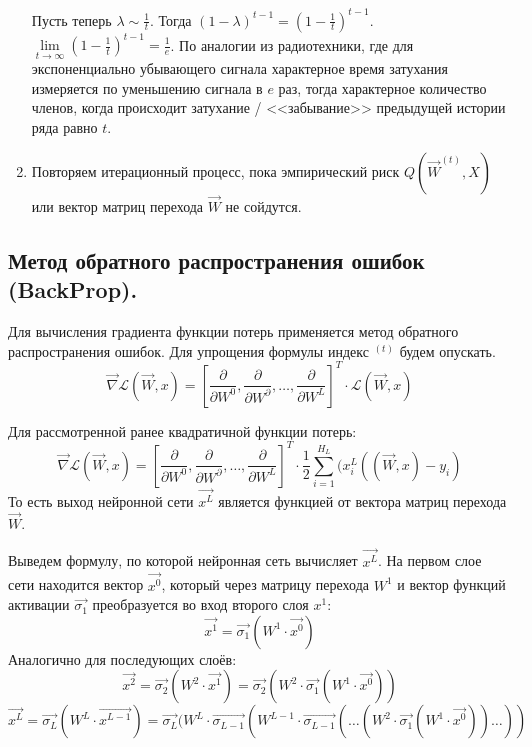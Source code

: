 \begin{enumerate}
	Пусть теперь $\lambda \sim \frac{1}{t}$. Тогда $(1-\lambda)^{t-1} = (1 - \frac{1}{t})^{t-1}$. $\lim\limits_{t\rightarrow \infty} (1 - \frac{1}{t})^{t-1} = \frac{1}{e}$. По аналогии из радиотехники, где для экспоненциально убывающего сигнала характерное время затухания измеряется по уменьшению сигнала в $e$ раз, тогда характерное количество членов, когда происходит затухание / <<забывание>> предыдущей истории ряда равно $t$.
		
	\item Повторяем итерационный процесс, пока эмпирический риск $Q(\overrightarrow{W}^{(t)}, X)$ или вектор матриц перехода $\overrightarrow{W}$ не сойдутся.
\end{enumerate}

\subsection{Метод обратного распространения ошибок (BackProp).}

Для вычисления градиента функции потерь применяется метод обратного распространения ошибок. Для упрощения формулы индекс ${}^{(t)}$ будем опускать.
$$
\overrightarrow{\nabla} \mathcal{L} (\overrightarrow{W}, x) = \left[\frac{\partial}{\partial W^0}, \frac{\partial}{\partial W^\partial}, \dots, \frac{\partial}{\partial W^L}\right]^T \cdot \mathcal{L} (\overrightarrow{W}, x)
$$

Для рассмотренной ранее квадратичной функции потерь:
$$
\overrightarrow{\nabla} \mathcal{L} (\overrightarrow{W}, x) = \left[\frac{\partial}{\partial W^0}, \frac{\partial}{\partial W^\partial}, \dots, \frac{\partial}{\partial W^L}\right]^T \cdot \frac{1}{2} \sum\limits_{i = 1}^{H_L} (x^L_i ((\overrightarrow{W}, x) - y_i)
$$
То есть выход нейронной сети $\overrightarrow{x^L}$ является функцией от вектора матриц перехода $\overrightarrow{W}$.

Выведем формулу, по которой нейронная сеть вычисляет $\overrightarrow{x^L}$. На первом слое сети находится вектор $\overrightarrow{x^0}$, который через матрицу перехода $W^1$ и вектор функций активации $\overrightarrow{\sigma_1}$ преобразуется во вход второго слоя $x^1$:
$$
\overrightarrow{x^1} = \overrightarrow{\sigma_1} (W^1 \cdot \overrightarrow{x^0})
$$
Аналогично для последующих слоёв:
$$
\overrightarrow{x^2} = \overrightarrow{\sigma_2} (W^2 \cdot \overrightarrow{x^1}) = \overrightarrow{\sigma_2} (W^2 \cdot \overrightarrow{\sigma_1} (W^1 \cdot \overrightarrow{x^0}))
$$
$$
\overrightarrow{x^L} = \overrightarrow{\sigma_L}(W^L \cdot \overrightarrow{x^{L-1}}) = \overrightarrow{\sigma_L}(W^L \cdot \overrightarrow{\sigma_{L-1}} (W^{L-1} \cdot \overrightarrow{\sigma_{L-1}}( \dots ( W^2 \cdot \overrightarrow{\sigma_1} (W^1 \cdot \overrightarrow{x^0})) \dots ))
$$

